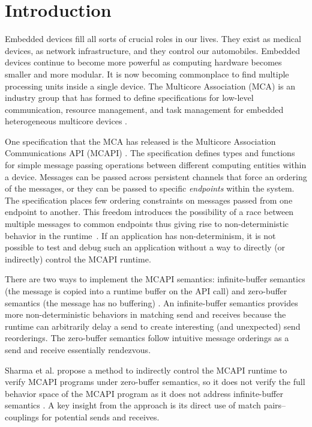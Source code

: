 \section{Introduction}
Embedded devices fill all sorts of crucial roles in our lives. They exist as
medical devices, as network infrastructure, and they control our automobiles.
Embedded devices continue to become more powerful as computing hardware becomes
smaller and more modular. It is now becoming commonplace to find multiple
processing units inside a single device. The Multicore Association (MCA) is an
industry group that has formed to define specifications for low-level
communication, resource management, and task management for embedded heterogeneous
multicore devices \cite{mca}.

One specification that the MCA has released is the Multicore
Association Communications API (MCAPI) \cite{mcapi}. The specification
defines types and functions for simple message passing operations between different
computing entities within a device. Messages can be passed across
persistent channels that force an ordering of the messages, or they
can be passed to specific \emph{endpoints} within the system. The
specification places few ordering constraints on messages passed from
one endpoint to another. This freedom introduces the possibility of a race between multiple messages to common endpoints thus giving rise to non-deterministic behavior in the runtime\ \cite{netzer:spdt96}. If an
application has non-determinism, it is not possible
to test and debug such an application without a way to directly (or
indirectly) control the MCAPI runtime.

There are two ways to implement the MCAPI semantics: infinite-buffer
semantics (the message is copied into a runtime buffer on the API
call) and zero-buffer semantics (the message has no buffering)
\cite{sarvani:fm09}.  An infinite-buffer semantics provides more
non-deterministic behaviors in matching send and receives because the
runtime can arbitrarily delay a send to create interesting (and
unexpected) send reorderings. The zero-buffer semantics follow
intuitive message orderings as a send and receive essentially
rendezvous.

Sharma et al. propose a method to indirectly control the MCAPI
runtime to verify MCAPI programs under zero-buffer semantics, so it
does not verify the full behavior space of the MCAPI program as it
does not address infinite-buffer semantics
\cite{sharma:fmcad09}. A key insight from the approach is its direct
use of match pairs--couplings for potential sends and receives.

